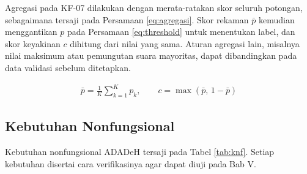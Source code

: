 Agregasi pada KF-07 dilakukan dengan merata-ratakan skor seluruh potongan, sebagaimana tersaji pada Persamaan \ref{eq:agregasi}. Skor rekaman $\bar{p}$ kemudian menggantikan $p$ pada Persamaan \ref{eq:threshold} untuk menentukan label, dan skor keyakinan $c$ dihitung dari nilai yang sama. Aturan agregasi lain, misalnya nilai maksimum atau pemungutan suara mayoritas, dapat dibandingkan pada data validasi sebelum ditetapkan.

\begin{align}
  \bar{p} = \frac{1}{K}\sum_{k=1}^{K} p_k, \qquad c = \max\left(\bar{p},\, 1-\bar{p}\right)
  \label{eq:agregasi}
\end{align}

\subsection{Kebutuhan Nonfungsional}
\label{knf}

Kebutuhan nonfungsional ADADeH tersaji pada Tabel \ref{tab:knf}. Setiap kebutuhan disertai cara verifikasinya agar dapat diuji pada Bab V.

